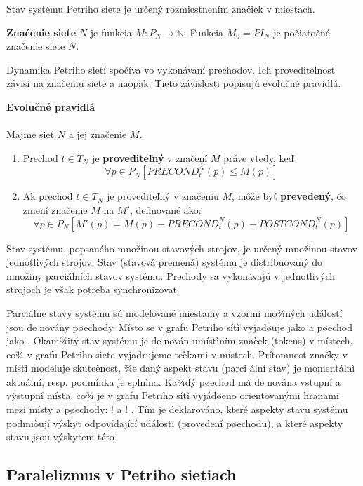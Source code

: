 Stav systému Petriho siete je určený rozmiestnením značiek v miestach.

\begin{defn}
	\textbf{Značenie siete} $N$ je funkcia $M : P_N \longrightarrow \mathbb{N}$. Funkcia $M_0 = PI_N$ je počiatočné značenie siete $N$.
	
\end{defn}

	Dynamika Petriho sietí spočíva vo vykonávaní prechodov. Ich provediteľnosť závisí na značeniu siete a naopak. Tieto závislosti popisujú evolučné pravidlá.
	
\begin{defn}
	\textbf{Evolučné pravidlá} \\\\ Majme sieť $N$ a jej značenie $M$.
	\begin{enumerate}
		\item Prechod $t \in T_N$ je \textbf{provediteľný} v značení $M$ práve vtedy, keď
		$$ \forall p \in P_N [PRECOND_t^N(p) \leq M(p) ]$$
		\item Ak prechod $t \in T_N$ je provediteľný v značeniu $M$, môže byť \textbf{prevedený}, čo zmení značenie $M$ na $M'$, definované ako:
		$$\forall p \in P_N [M'(p)=M(p) - PRECOND_t^N(p) + POSTCOND_t^N(p) ]$$ 
	\end{enumerate}
\end{defn}  



Stav systému, popsaného množinou stavových strojov, je určený množinou stavov jednotlivých strojov. Stav (stavová premená) systému je distribuovaný do množiny parciálních stavov systému. Prechody sa vykonávajú v jednotlivých strojoch je však potreba synchronizovat

Parciálne stavy systému sú modelované miestamy a vzormi mo¾ných událostí jsou denovány
pøechody. Místo se v grafu Petriho sítì vyjadøuje jako 
 a pøechod jako . Okam¾itý stav
systému je denován umístìním znaèek (tokens) v místech, co¾ v grafu Petriho siete vyjadrujeme
teèkami v místech. Prítomnost značky v místì modeluje skuteènost, ¾e daný aspekt stavu (parci
ální stav) je momentálnì aktuální, resp. podmínka je splnìna. Ka¾dý pøechod má denována
vstupní a výstupní místa, co¾ je v grafu Petriho sítì vyjádøeno orientovanými hranami mezi
místy a pøechody: 
! a !
. Tím je deklarováno, které aspekty stavu systému podmiòují
výskyt odpovídající události (provedení pøechodu), a které aspekty stavu jsou výskytem této

\subsection{Paralelizmus v Petriho sietiach}

